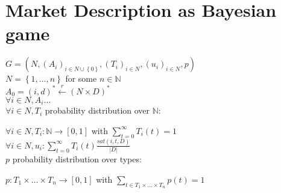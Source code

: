 \section{Market Description as Bayesian game}
  $G = \left(N, \left(A_i\right)_{i \in N \cup \left\{0\right\}}, \left(T_i\right)_{i \in
  N}, \left(u_i\right)_{i \in N}, p\right)$ \\
  $N = \left\{1, \dots, n\right\}$ for some $n \in \mathbb{N}$ \\
  $A_0 = \left(i, d\right)^* \overset{r}{\leftarrow} \left(N \times D\right)^*$ \\
  $\forall i \in N, A_i \dots$ \\
  $\forall i \in N, T_i$ probability distribution over $\mathbb{N}$:

  $\forall i \in N, T_i: \mathbb{N} \rightarrow \left[0, 1\right]$ with $\sum\limits_{t =
  0}^\infty T_i\left(t\right) = 1$ \\
  $\forall i \in N, u_i: \sum\limits_{t = 0}^\infty T_i\left(t\right)\frac{sat\left(i, t,
  D\right)}{|D|}$ \\
  $p$ probability distribution over types:

  $p: T_1 \times \dots \times T_n \rightarrow \left[0, 1\right]$ with
  $\sum\limits_{t \in T_1 \times \dots \times T_n} p\left(t\right) = 1$

